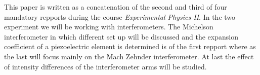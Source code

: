 This paper is written as a concatenation of the second and third of four mandatory repports during the course \emph{Experimental Physics II}. In the two experiment we will be working with interferometers. The Michelson interferometer in which different set up will be discussed and the expansion coefficient of a piezoelectric element is determined is of the first repport where as the last will focus mainly on the Mach Zehnder interferometer. At last the effect of intensity differences of the interferometer arms will be studied.
